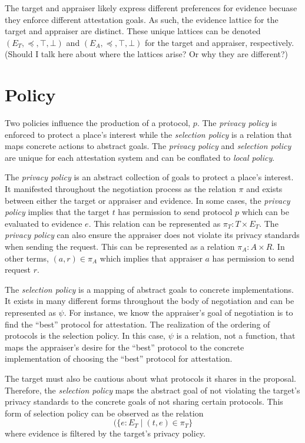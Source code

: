 \documentclass[sigconf,authordraft]{acmart}
\begin{document}
The target and appraiser likely express different preferences for evidence becuase they enforce different attestation goals. As such, the evidence lattice for the target and appraiser are distinct.  These unique lattices can be denoted $(E_T,\preceq,\top,\bot)$ and $(E_A,\preceq,\top,\bot)$ for the target and appraiser, respectively. (Should I talk here about where the lattices arise? Or why they are different?) 

\section{Policy}

Two policies influence the production of a protocol, $p$. The \emph{privacy policy} is enforced to protect a place's interest while the \emph{selection policy} is a relation that maps concrete actions to abstract goals. The \emph{privacy policy} and \emph{selection policy} are unique for each attestation system and can be conflated to \emph{local policy}.

The \emph{privacy policy} is an abstract collection of goals to protect a place's interest. It manifested throughout the negotiation process as the relation $\pi$ and exists between either the target or appraiser and evidence. In some cases, the \emph{privacy policy} implies that the target $t$ has permission to send protocol $p$ which can be evaluated to evidence $e$. This relation can be represented as $\pi_T : T\times E_T$. The \emph{privacy policy} can also ensure the appraiser does not violate its privacy standards when sending the request. This can be represented as a relation  $\pi_A : A\times R$. In other terms, $(a,r)\in\pi_A$ which implies that appraiser $a$ has permission to send request $r$.

The \emph{selection policy} is a mapping of abstract goals to concrete implementations. It exists in many different forms throughout the body of negotiation and can be represented as $\psi$. For instance, we know the appraiser's goal of negotiation is to find the ``best'' protocol for attestation. The realization of the ordering of protocols is the selection policy. In this case, $\psi$ is a relation, not a function, that maps the appraiser's desire for the ``best'' protocol to the concrete implementation of choosing the ``best'' protocol for attestation.

The target must also be cautious about what protocols it shares in the proposal. Therefore, the \emph{selection policy} maps the abstract goal of not violating the target's privacy standards to the concrete goals of not sharing certain protocols. This form of selection policy can be observed as the relation \[(\{e:E_T\mid (t,e)\in\pi_T\}\] where evidence is filtered by the target's privacy policy.   
\end{document}
